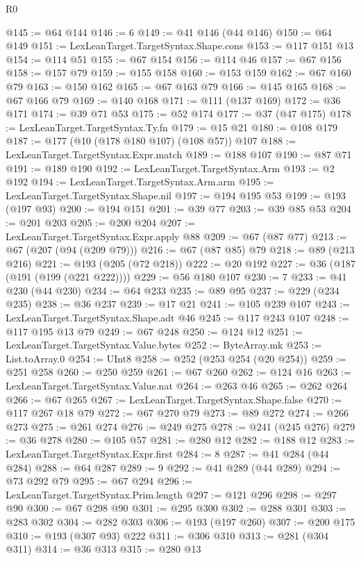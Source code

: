 \begin{lexlean}{R0}
\begin{coremodule}
{{{{{{{{{{{{{{{{{{{{{{{{{{{{{{{{@145 := @64 @144
@146 := 6
@149 := @41 @146 (@44 @146)
@150 := @64 @149
@151 := LexLeanTarget.TargetSyntax.Shape.cons
@153 := @117 @151 @13
@154 := @114 @51
@155 := @67 @154
@156 := @114 @46
@157 := @67 @156
@158 := @157 @79
@159 := @155 @158
@160 := @153 @159
@162 := @67 @160 @79
@163 := @150 @162
@165 := @67 @163 @79
@166 := @145 @165
@168 := @67 @166 @79
@169 := @140 @168
@171 := @111 (@137 @169)
@172 := @36 @171
@174 := @39 @71 @53
@175 := @52 @174
@177 := @37 (@47 @175)
@178 := LexLeanTarget.TargetSyntax.Ty.fn
@179 := @15 @21
@180 := @108 @179
@187 := @177 (@10 (@178 @180 @107) (@108 @57)) @107
@188 := LexLeanTarget.TargetSyntax.Expr.match
@189 := @188 @107
@190 := @87 @71
@191 := @189 @190
@192 := LexLeanTarget.TargetSyntax.Arm
@193 := @2 @192
@194 := LexLeanTarget.TargetSyntax.Arm.arm
@195 := LexLeanTarget.TargetSyntax.Shape.nil
@197 := @194 @195 @53
@199 := @193 (@197 @93)
@200 := @194 @151
@201 := @39 @77
@203 := @39 @85 @53
@204 := @201 @203
@205 := @200 @204
@207 := LexLeanTarget.TargetSyntax.Expr.apply @88
@209 := @67 (@87 @77)
@213 := @67 (@207 (@94 (@209 @79)))
@216 := @67 (@87 @85) @79
@218 := @89 (@213 @216)
@221 := @193 (@205 (@72 @218))
@222 := @20 @192
@227 := @36 (@187 (@191 (@199 (@221 @222))))
@229 := @56 @180 @107
@230 := 7
@233 := @41 @230 (@44 @230)
@234 := @64 @233
@235 := @89 @95
@237 := @229 (@234 @235)
@238 := @36 @237
@239 := @17 @21
@241 := @105 @239 @107
@243 := LexLeanTarget.TargetSyntax.Shape.adt @46
@245 := @117 @243 @107
@248 := @117 @195 @13 @79
@249 := @67 @248
@250 := @124 @12
@251 := LexLeanTarget.TargetSyntax.Value.bytes
@252 := ByteArray.mk
@253 := List.toArray.{0}
@254 := UInt8
@258 := @252 (@253 @254 (@20 @254))
@259 := @251 @258
@260 := @250 @259
@261 := @67 @260
@262 := @124 @16
@263 := LexLeanTarget.TargetSyntax.Value.nat
@264 := @263 @46
@265 := @262 @264
@266 := @67 @265
@267 := LexLeanTarget.TargetSyntax.Shape.false
@270 := @117 @267 @18 @79
@272 := @67 @270 @79
@273 := @89 @272
@274 := @266 @273
@275 := @261 @274
@276 := @249 @275
@278 := @241 (@245 @276)
@279 := @36 @278
@280 := @105 @57
@281 := @280 @12
@282 := @188 @12
@283 := LexLeanTarget.TargetSyntax.Expr.first
@284 := 8
@287 := @41 @284 (@44 @284)
@288 := @64 @287
@289 := 9
@292 := @41 @289 (@44 @289)
@294 := @73 @292 @79
@295 := @67 @294
@296 := LexLeanTarget.TargetSyntax.Prim.length
@297 := @121 @296
@298 := @297 @90
@300 := @67 @298 @90
@301 := @295 @300
@302 := @288 @301
@303 := @283 @302
@304 := @282 @303
@306 := @193 (@197 @260)
@307 := @200 @175
@310 := @193 (@307 @93) @222
@311 := @306 @310
@313 := @281 (@304 @311)
@314 := @36 @313
@315 := @280 @13
}}}}}}}}}}}}}}}}}}}}}}}}}}}}}}}}
\end{coremodule}
\end{lexlean}
